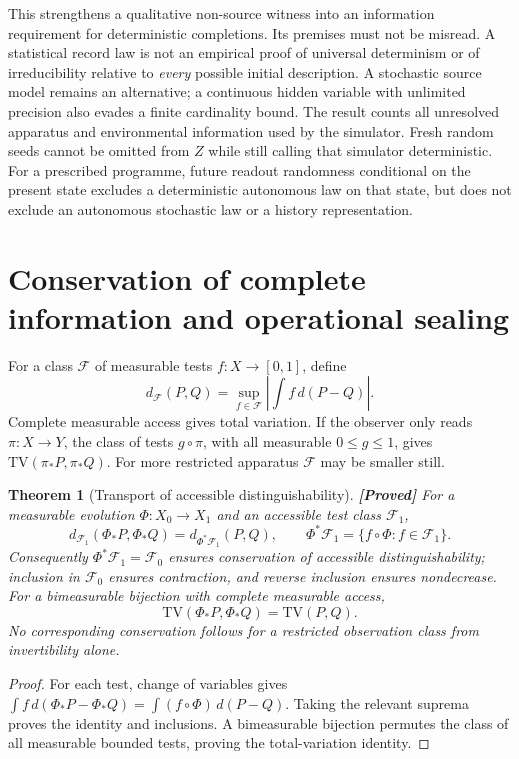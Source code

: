\documentclass[11pt,a4paper]{article}
\newtheorem{theorem}{Theorem}[section]
\theoremstyle{definition}
\theoremstyle{remark}\newtheorem{remark}[theorem]{Remark}
\newcommand{\status}[1]{\textbf{[#1]}\quad}
\newcommand{\TV}{\mathrm{TV}}
\begin{document}
This strengthens a qualitative non-source witness into an information
requirement for deterministic completions. Its premises must not be
misread. A statistical record law is not an empirical proof of universal
determinism or of irreducibility relative to \emph{every} possible initial
description. A stochastic source model remains an alternative; a
continuous hidden variable with unlimited precision also evades a finite
cardinality bound. The result counts all unresolved apparatus and
environmental information used by the simulator. Fresh random seeds
cannot be omitted from $Z$ while still calling that simulator
deterministic. For a prescribed programme, future readout randomness
conditional on the present state excludes a deterministic autonomous
law on that state, but does not exclude an autonomous stochastic law or
a history representation.

\section{Conservation of complete information and operational sealing}
\label{op:conservation}

For a class $\mathcal F$ of measurable tests $f:X\to[0,1]$, define
\[
 d_{\mathcal F}(P,Q)
 =\sup_{f\in\mathcal F}\left|\int f\,d(P-Q)\right|.
\]
Complete measurable access gives total variation. If the observer only
reads $\pi:X\to Y$, the class of tests $g\circ\pi$, with all measurable
$0\le g\le1$, gives $\TV(\pi_*P,\pi_*Q)$. For more restricted apparatus
$\mathcal F$ may be smaller still.

\begin{theorem}[Transport of accessible distinguishability]
\label{op:transport}
\status{Proved}
For a measurable evolution $\Phi:X_0\to X_1$ and an accessible test
class $\mathcal F_1$,
\[
 d_{\mathcal F_1}(\Phi_*P,\Phi_*Q)
 =d_{\Phi^*\mathcal F_1}(P,Q),\qquad
 \Phi^*\mathcal F_1=\{f\circ\Phi:f\in\mathcal F_1\}.
\]
Consequently $\Phi^*\mathcal F_1=\mathcal F_0$ ensures conservation of
accessible distinguishability; inclusion in $\mathcal F_0$ ensures
contraction, and reverse inclusion ensures nondecrease. For a
bimeasurable bijection with complete measurable access,
\[
 \TV(\Phi_*P,\Phi_*Q)=\TV(P,Q).
\]
No corresponding conservation follows for a restricted observation
class from invertibility alone.
\end{theorem}

\begin{proof}
For each test, change of variables gives
$\int f\,d(\Phi_*P-\Phi_*Q)=\int(f\circ\Phi)\,d(P-Q)$.
Taking the relevant suprema proves the identity and inclusions. A
bimeasurable bijection permutes the class of all measurable bounded
tests, proving the total-variation identity.
\end{proof}
\end{document}
